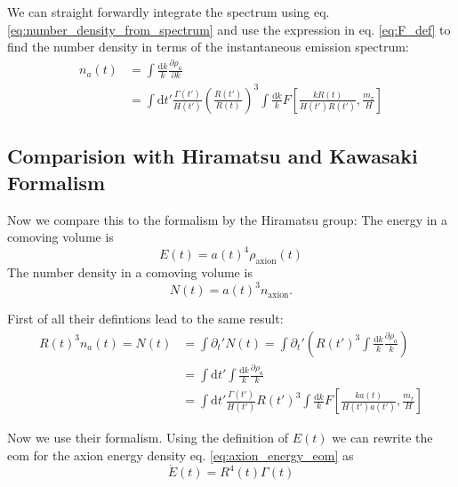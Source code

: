 \documentclass[a4paper]{article}
\begin{document}
We can straight forwardly integrate the spectrum using eq. \eqref{eq:number_density_from_spectrum}  and use the expression in eq. \eqref{eq:F_def} to find the number density in terms of the instantaneous emission spectrum:
\begin{align}
	\label{eq:number_density_from_F}
	n_a(t) &= \int \frac{\mathrm{d} k}{k} \frac{\partial \rho_a}{\partial k} \\
	&= \int \mathrm{d} t' \frac{\Gamma(t')}{H(t')} \left(\frac{R(t')}{R(t)}\right)^3 \int \frac{\mathrm{d} k}{k} F\left[\frac{kR(t)}{H(t')R(t')}, \frac{m_r}{H}\right]
\end{align}

\subsection{Comparision with Hiramatsu and Kawasaki Formalism}
Now we compare this to the formalism by the Hiramatsu group:
The energy in a comoving volume is
\begin{equation}
	E(t) = a(t)^4 \rho_\mathrm{axion}(t)
\end{equation}
The number density in a comoving volume is
\begin{equation}
	N(t) = a(t)^3 n_\mathrm{axion}.
\end{equation}

First of all their defintions lead to the same result:
\begin{align}
	\label{eq:hiramatsu_is_the_same_as_gorghetto}
	R(t)^3 n_a(t) = N(t) &= \int \partial_t' N(t) = \int \partial_t' \left( R(t')^3 \int \frac{\mathrm{d} k}{k} \frac{\partial \rho_a}{k} \right) \\
	&= \int \mathrm{d} t' \int \frac{\mathrm{d} k}{k} \frac{\partial \rho_a}{k} \\
	&= \int \mathrm{d} t' \frac{\Gamma(t')}{H(t')} R(t')^3 \int \frac{\mathrm{d} k}{k} F\left[\frac{ka(t)}{H(t')a(t')}, \frac{m_r}{H}\right]
\end{align}

Now we use their formalism.
Using the definition of $E(t)$ we can rewrite the eom for the axion energy density eq. \eqref{eq:axion_energy_eom} as 
\begin{equation}
	\dot{E}(t) = R^4(t) \Gamma(t)
\end{equation}
\end{document}
